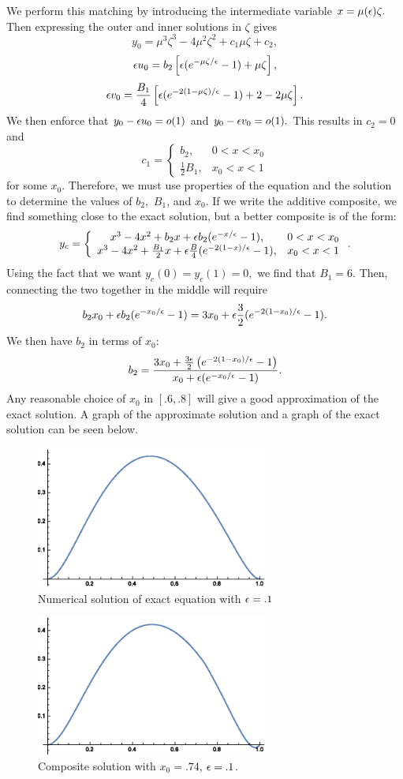         We perform this matching by introducing the intermediate variable $x=\mu(\epsilon)\zeta.$ Then expressing the outer and inner solutions in $\zeta$ gives
        $$y_0=\mu^3\zeta^3-4\mu^2\zeta^2+c_1\mu\zeta+c_2,$$
        $$\epsilon u_0=b_2\left[\epsilon(e^{-\mu\zeta/\epsilon}-1)+\mu\zeta\right],$$
        $$\epsilon v_0=\frac{B_1}{4}\left[\epsilon(e^{-2(1-\mu\zeta)/\epsilon}-1)+2-2\mu\zeta\right].$$
        We then enforce that $y_0-\epsilon u_0=o(1)$ and $y_0-\epsilon v_0=o(1).$ This results in $c_2=0$ and
         $$c_1=\left\{\begin{array}{cc}b_2,&0<x<x_0\\ \frac{1}{2}B_1,&x_0<x<1\end{array}\right.$$
         for some $x_0.$
       Therefore, we must use properties of the equation and the solution to determine the values of $b_2,$ $B_1$, and $x_0$. If we write the additive composite, we find something close to the exact solution, but a better composite is of the form:
       $$y_c=\left\{\begin{array}{cc}x^3-4x^2+b_2 x+\epsilon b_2(e^{-x/\epsilon}-1),&0<x<x_0\\ x^3-4x^2+\frac{B_1}{2}x+\epsilon\frac{B}{4}(e^{-2(1-x)/\epsilon}-1),&x_0<x<1\end{array}\right. .$$
       Using the fact that we want $y_c(0)=y_c(1)=0,$ we find that $B_1=6$. Then, connecting the two together in the middle will require 
       $$b_2x_0+\epsilon b_2(e^{-x_0/\epsilon}-1)=3x_0+\epsilon \frac{3}{2}(e^{-2(1-x_0)/\epsilon}-1).$$
       We then have $b_2$ in terms of $x_0:$
       $$b_2=\frac{3x_0+\frac{3\epsilon}{2}\left(e^{-2(1-x_0)/\epsilon}-1\right)}{x_0+\epsilon(e^{-x_0/\epsilon}-1)}.$$
        Any reasonable choice of $x_0$ in $[.6,.8]$ will give a good approximation of the exact solution.
        A graph of the approximate solution and a graph of the exact solution can be seen below.
        
\begin{figure}
  \centering
  \includegraphics[width=3in]{exactsoln}
  \caption{Numerical solution of exact equation with $\epsilon=.1$}
\end{figure}
\begin{figure}
  \centering
  \includegraphics[width=3in]{composite}
  \caption{Composite solution with $x_0=.74$, $\epsilon=.1$.}
\end{figure}

        


        \eenum
        \eenum
        
